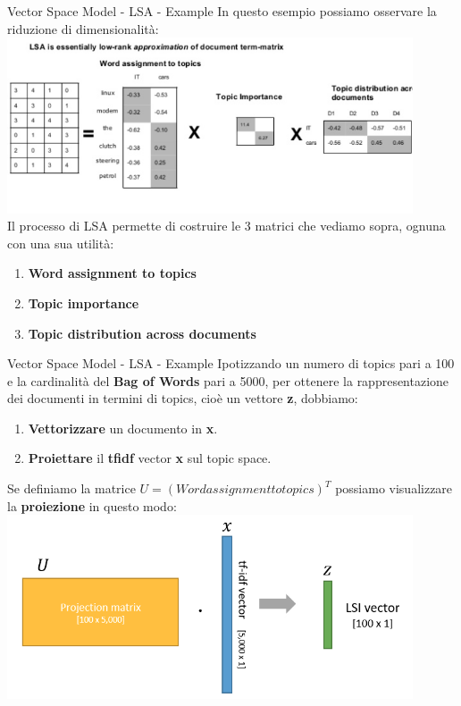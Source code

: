 \documentclass[british]{beamer}
\begin{document}
\begin{frame}{Vector Space Model - LSA - Example}
	In questo esempio possiamo osservare la riduzione di dimensionalit\`{a}:
	\includegraphics[width=0.9\textwidth, height=0.5
	\textheight]{./Imgs/LSA2}\\
	Il processo di LSA permette di costruire le 3 matrici che vediamo sopra, ognuna con una sua utilit\`{a}:
	\begin{enumerate}
		\item \textbf{Word assignment to topics}
		\item \textbf{Topic importance}
		\item \textbf{Topic distribution across documents}
	\end{enumerate}
\end{frame}

\begin{frame}{Vector Space Model - LSA - Example}
	Ipotizzando un numero di topics pari a 100 e la cardinalit\`{a} del \textbf{Bag of Words} pari a 5000, per ottenere la rappresentazione dei documenti in termini di topics, cio\`{e} un vettore \textbf{z}, dobbiamo:
	\begin{enumerate}
		\item \textbf{Vettorizzare} un documento in \textbf{x}.
		\item \textbf{Proiettare} il \textbf{tfidf} vector \textbf{x} sul topic space.
	\end{enumerate}
	Se definiamo la matrice \(U = (Word assignment to topics)^T\) possiamo visualizzare la \textbf{proiezione} in questo modo:
	\includegraphics[width=0.9\textwidth, height=0.5\textheight]{./Imgs/LSI}

\end{frame}
\end{document}
